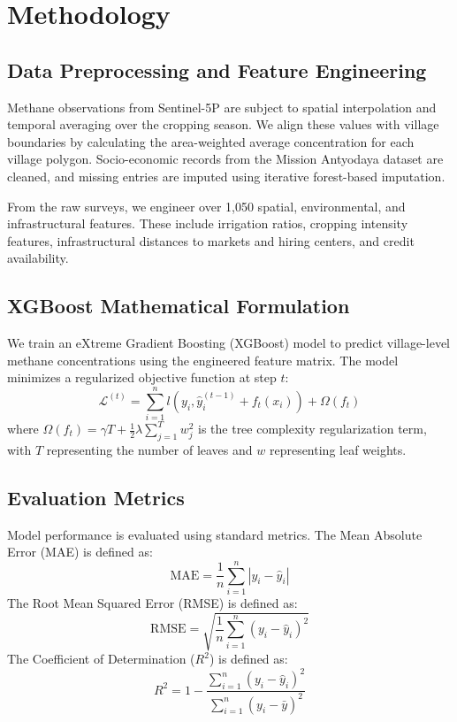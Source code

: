 \documentclass[12pt,a4paper]{report}
\begin{document}
\section{Methodology}
\subsection{Data Preprocessing and Feature Engineering}
Methane observations from Sentinel-5P are subject to spatial interpolation and temporal averaging over the cropping season. We align these values with village boundaries by calculating the area-weighted average concentration for each village polygon. Socio-economic records from the Mission Antyodaya dataset are cleaned, and missing entries are imputed using iterative forest-based imputation.

From the raw surveys, we engineer over 1,050 spatial, environmental, and infrastructural features. These include irrigation ratios, cropping intensity features, infrastructural distances to markets and hiring centers, and credit availability.

\subsection{XGBoost Mathematical Formulation}
We train an eXtreme Gradient Boosting (XGBoost) model to predict village-level methane concentrations using the engineered feature matrix. The model minimizes a regularized objective function at step $t$:
\begin{equation}
\mathcal{L}^{(t)} = \sum_{i=1}^{n} l\left(y_i, \hat{y}_i^{(t-1)} + f_t(x_i)\right) + \Omega(f_t)
\label{eq:xgboost_obj}
\end{equation}
where $\Omega(f_t) = \gamma T + \frac{1}{2}\lambda \sum_{j=1}^{T} w_j^2$ is the tree complexity regularization term, with $T$ representing the number of leaves and $w$ representing leaf weights.

\subsection{Evaluation Metrics}
Model performance is evaluated using standard metrics.
The Mean Absolute Error (MAE) is defined as:
\begin{equation}
\text{MAE} = \frac{1}{n}\sum_{i=1}^{n}|y_i - \hat{y}_i|
\label{eq:mae}
\end{equation}
The Root Mean Squared Error (RMSE) is defined as:
\begin{equation}
\text{RMSE} = \sqrt{\frac{1}{n}\sum_{i=1}^{n}(y_i - \hat{y}_i)^2}
\label{eq:rmse}
\end{equation}
The Coefficient of Determination ($R^2$) is defined as:
\begin{equation}
R^2 = 1 - \frac{\sum_{i=1}^{n} (y_i - \hat{y}_i)^2}{\sum_{i=1}^{n} (y_i - \bar{y})^2}
\label{eq:r2}
\end{equation}
\end{document}
